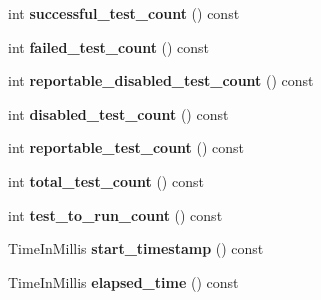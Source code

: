 \begin{DoxyCompactItemize}
\item 
\hypertarget{classtesting_1_1_unit_test_a4795d58351f03498d5823a743b0722c5}{}int {\bfseries successful\+\_\+test\+\_\+count} () const \label{classtesting_1_1_unit_test_a4795d58351f03498d5823a743b0722c5}

\item 
\hypertarget{classtesting_1_1_unit_test_aeda0f8ca87adf65f634c3d6d9ab98598}{}int {\bfseries failed\+\_\+test\+\_\+count} () const \label{classtesting_1_1_unit_test_aeda0f8ca87adf65f634c3d6d9ab98598}

\item 
\hypertarget{classtesting_1_1_unit_test_aa5eaf98c5d9cc0afe501ac03e6414188}{}int {\bfseries reportable\+\_\+disabled\+\_\+test\+\_\+count} () const \label{classtesting_1_1_unit_test_aa5eaf98c5d9cc0afe501ac03e6414188}

\item 
\hypertarget{classtesting_1_1_unit_test_a4cbd084447b74784d1bb85c1ed4b96d5}{}int {\bfseries disabled\+\_\+test\+\_\+count} () const \label{classtesting_1_1_unit_test_a4cbd084447b74784d1bb85c1ed4b96d5}

\item 
\hypertarget{classtesting_1_1_unit_test_aa32cb4f3cd34564a5c641bd409f8f83b}{}int {\bfseries reportable\+\_\+test\+\_\+count} () const \label{classtesting_1_1_unit_test_aa32cb4f3cd34564a5c641bd409f8f83b}

\item 
\hypertarget{classtesting_1_1_unit_test_a54315b233d354693b9aa1184cf2996de}{}int {\bfseries total\+\_\+test\+\_\+count} () const \label{classtesting_1_1_unit_test_a54315b233d354693b9aa1184cf2996de}

\item 
\hypertarget{classtesting_1_1_unit_test_a953a52f89898a04ee4a4e08469407cd3}{}int {\bfseries test\+\_\+to\+\_\+run\+\_\+count} () const \label{classtesting_1_1_unit_test_a953a52f89898a04ee4a4e08469407cd3}

\item 
\hypertarget{classtesting_1_1_unit_test_adb9fdaf25b601f91bd55606941d05c80}{}Time\+In\+Millis {\bfseries start\+\_\+timestamp} () const \label{classtesting_1_1_unit_test_adb9fdaf25b601f91bd55606941d05c80}

\item 
\hypertarget{classtesting_1_1_unit_test_a87853e2fe9f0b172467534323cb9d267}{}Time\+In\+Millis {\bfseries elapsed\+\_\+time} () const \label{classtesting_1_1_unit_test_a87853e2fe9f0b172467534323cb9d267}


\end{DoxyCompactItemize}
